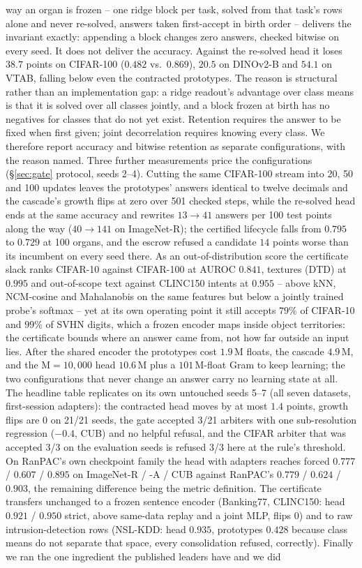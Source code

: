 \documentclass{article}
\begin{document}
way an organ is frozen -- one ridge block per task, solved from that task's rows
alone and never re-solved, answers taken first-accept in birth order -- delivers
the invariant exactly: appending a block changes zero answers, checked bitwise on
every seed. It does not deliver the accuracy. Against the re-solved head it loses
$38.7$ points on CIFAR-100 ($0.482$ vs.\ $0.869$), $20.5$ on DINOv2-B and $54.1$ on VTAB, falling below even the contracted prototypes. The reason is structural rather
than an implementation gap: a ridge readout's advantage over class means is that
it is solved over all classes jointly, and a block frozen at birth has no
negatives for classes that do not yet exist. Retention requires the answer to be
fixed when first given; joint decorrelation requires knowing every class. We
therefore report accuracy and bitwise retention as separate configurations, with
the reason named. Three further measurements price the configurations (\S\ref{sec:gate} protocol, seeds 2--4). Cutting the same CIFAR-100 stream into 20, 50 and 100 updates leaves the prototypes' answers identical to twelve decimals and the cascade's growth flips at zero over 501 checked steps, while the re-solved head ends at the same accuracy and rewrites $13\to41$ answers per 100 test points along the way ($40\to141$ on ImageNet-R); the certified lifecycle falls from $0.795$ to $0.729$ at 100 organs, and the escrow refused a candidate $14$ points worse than its incumbent on every seed there. As an out-of-distribution score the certificate slack ranks CIFAR-10 against CIFAR-100 at AUROC $0.841$, textures (DTD) at $0.995$ and out-of-scope text against CLINC150 intents at $0.955$ -- above kNN, NCM-cosine and Mahalanobis on the same features but below a jointly trained probe's softmax -- yet at its own operating point it still accepts $79$\% of CIFAR-10 and $99$\% of SVHN digits, which a frozen encoder maps inside object territories: the certificate bounds where an answer came from, not how far outside an input lies. After the shared encoder the prototypes cost $1.9$\,M floats, the cascade $4.9$\,M, and the M$=10{,}000$ head $10.6$\,M plus a $101$\,M-float Gram to keep learning; the two configurations that never change an answer carry no learning state at all. The headline table replicates on its own untouched seeds 5--7 (all seven datasets, first-session adapters): the contracted head moves by at most $1.4$ points, growth flips are 0 on 21/21 seeds, the gate accepted 3/21 arbiters with one sub-resolution regression ($-0.4$, CUB) and no helpful refusal, and the CIFAR arbiter that was accepted 3/3 on the evaluation seeds is refused 3/3 here at the rule's threshold. On RanPAC's own checkpoint family the head with adapters reaches forced $0.777$ / $0.607$ / $0.895$ on ImageNet-R / -A / CUB against RanPAC's $0.779$ / $0.624$ / $0.903$, the remaining difference being the metric definition. The certificate transfers unchanged to a frozen sentence encoder (Banking77, CLINC150: head $0.921$ / $0.950$ strict, above same-data replay and a joint MLP, flips 0) and to raw intrusion-detection rows (NSL-KDD: head $0.935$, prototypes $0.428$ because class means do not separate that space, every consolidation refused, correctly). Finally we ran the one ingredient the published leaders have and we did
\end{document}
